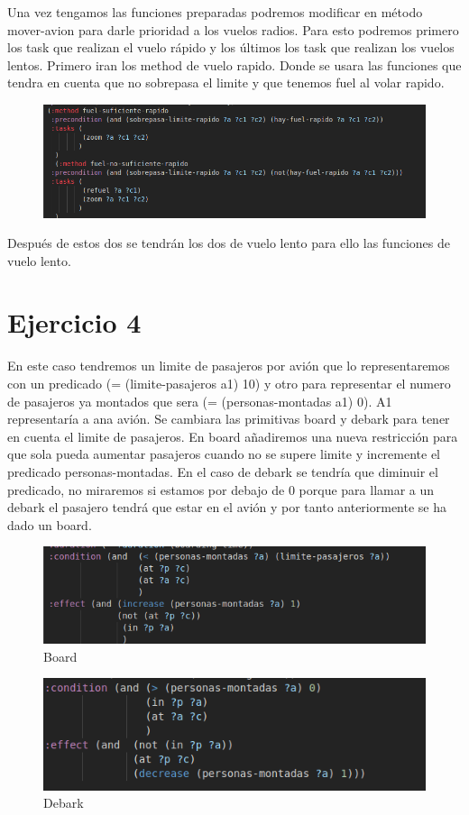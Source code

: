 \documentclass[]{article}
\begin{document}
Una vez tengamos las funciones preparadas podremos modificar en método mover-avion para darle prioridad a los vuelos radios. Para esto podremos primero los task que realizan el vuelo rápido y los últimos los task que realizan los vuelos lentos. Primero iran los method de vuelo rapido. Donde se usara las funciones que tendra en cuenta que no sobrepasa el limite y que tenemos fuel al volar rapido.
\begin{figure}[H]
	\centering
	\includegraphics[width=0.7\linewidth]{screenshot008}
	\caption{}
	\label{fig:screenshot008}
\end{figure}

Después de estos dos se tendrán los dos de vuelo lento para ello las funciones de vuelo lento.
\section{Ejercicio 4}
En este caso tendremos un limite de pasajeros por avión que lo representaremos con un predicado (= (limite-pasajeros a1) 10) y otro para representar el numero de pasajeros ya montados que sera (= (personas-montadas a1) 0). A1 representaría  a ana avión. 
Se cambiara las primitivas board y debark para tener en cuenta el limite de pasajeros. En board añadiremos una nueva restricción para que sola pueda aumentar pasajeros cuando no se supere limite y incremente el predicado personas-montadas. En el caso de debark se tendría que diminuir el predicado, no miraremos si estamos por debajo de 0 porque para llamar a un debark el pasajero tendrá que estar en el avión y por tanto anteriormente se ha dado un board.
\begin{figure}[H]
	\centering
	\includegraphics[width=0.7\linewidth]{screenshot009}
	\caption{Board}
	\label{fig:screenshot009}
\end{figure}

\begin{figure}[H]
	\centering
	\includegraphics[width=0.7\linewidth]{screenshot010}
	\caption{Debark}
	\label{fig:screenshot010}
\end{figure}
\end{document}
